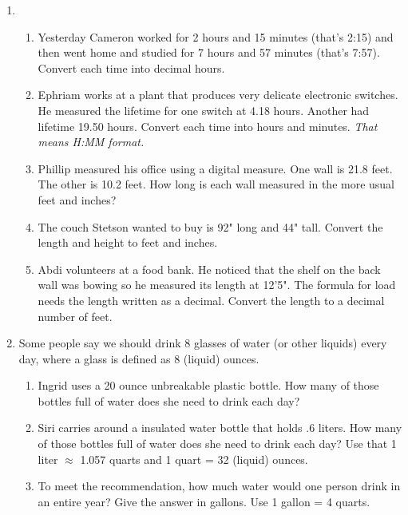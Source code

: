 \begin{enumerate}
\begin{enumerate}
\end{enumerate}

\newpage %

\item \begin{enumerate}
\item Yesterday Cameron worked for 2 hours and 15 minutes (that's 2:15) and then went home and studied for 7 hours and 57 minutes (that's 7:57).  Convert each time into decimal hours. \vfill
\item  Ephriam works at a plant that produces very delicate electronic switches.  He measured the lifetime for one switch at 4.18 hours.  Another had lifetime 19.50 hours.  Convert each time into hours and minutes.   \emph{That means H:MM format.}\vfill
\item Phillip measured his office using a digital measure. One wall is 21.8 feet. The other is 10.2 feet.   How long is each wall measured in the more usual feet and inches? \vfill
\item The couch Stetson wanted to buy is 92" long and 44" tall.  Convert the length and height to feet and inches. \vfill
\item Abdi volunteers at a food bank.  He noticed that the shelf on the back wall was bowing so he measured its length at 12'5".  The formula for load needs the length written as a decimal.  Convert the length to a decimal number of feet. \vfill
\end{enumerate}

\newpage %

\item Some people say we should drink 8 glasses of water (or other liquids) every day, where a glass is defined as 8 (liquid) ounces.
\begin{enumerate}
\item Ingrid uses a 20 ounce unbreakable plastic bottle.  How many of those bottles full of water does she need to drink each day?\vfill
\item Siri carries around a insulated water bottle that holds .6 liters.  How many of those bottles full of water does she need to drink each day?  Use that 1 liter $\approx$ 1.057 quarts and 1 quart = 32 (liquid) ounces.\vfill
\item To meet the recommendation, how much water would one person drink in an entire year?  Give the answer in gallons.  Use 1 gallon = 4 quarts.\vfill
\end{enumerate}

\newpage %


\end{enumerate}

